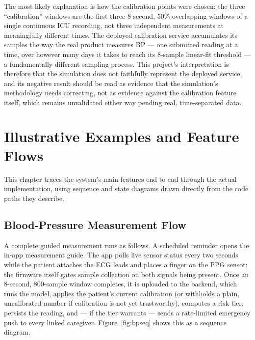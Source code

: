 \documentclass[12pt,a4paper]{report}
\begin{document}
The most likely explanation is how the calibration points were chosen: the three
``calibration'' windows are the first three 8-second, 50\%-overlapping windows
of a single continuous ICU recording, not three independent measurements at
meaningfully different times. The deployed calibration service accumulates its
samples the way the real product measures BP --- one submitted reading at a
time, over however many days it takes to reach its 8-sample linear-fit threshold
--- a fundamentally different sampling process. This project's interpretation is
therefore that the simulation does not faithfully represent the deployed service,
and its negative result should be read as evidence that the simulation's
methodology needs correcting, not as evidence against the calibration feature
itself, which remains unvalidated either way pending real, time-separated data.


\chapter{Illustrative Examples and Feature Flows}

This chapter traces the system's main features end to end through the actual
implementation, using sequence and state diagrams drawn directly from the code
paths they describe.

\section{Blood-Pressure Measurement Flow}

A complete guided measurement runs as follows. A scheduled reminder opens the
in-app measurement guide. The app polls live sensor status every two seconds
while the patient attaches the ECG leads and places a finger on the PPG sensor;
the firmware itself gates sample collection on both signals being present. Once
an 8-second, 800-sample window completes, it is uploaded to the backend, which
runs the model, applies the patient's current calibration (or withholds a plain,
uncalibrated number if calibration is not yet trustworthy), computes a risk
tier, persists the reading, and --- if the tier warrants --- sends a
rate-limited emergency push to every linked caregiver.
Figure~\ref{fig:bpseq} shows this as a sequence diagram.
\end{document}
